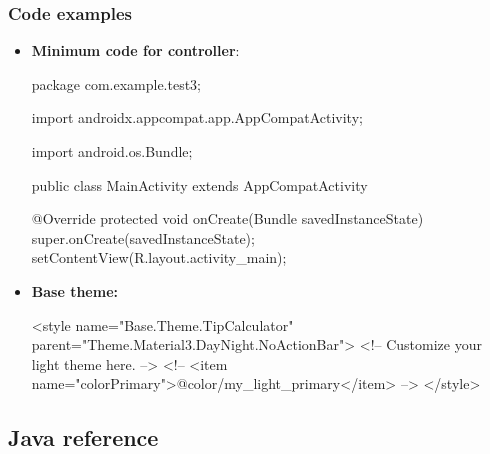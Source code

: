 \documentclass{report}
\begin{document}
\pagebreak 
    \subsubsection{Code examples}
    \begin{itemize}
        \item \textbf{Minimum code for controller}:
            \bigbreak \noindent 
            \begin{javacode}
                package com.example.test3;

                import androidx.appcompat.app.AppCompatActivity;

                import android.os.Bundle;

                public class MainActivity extends AppCompatActivity {

                    @Override
                    protected void onCreate(Bundle savedInstanceState) {
                        super.onCreate(savedInstanceState);
                        setContentView(R.layout.activity_main);
                    }
                }
            \end{javacode}
        \item \textbf{Base theme:} 
            \bigbreak \noindent 
            \begin{xmlcode}
                <style name="Base.Theme.TipCalculator" parent="Theme.Material3.DayNight.NoActionBar">
                    <!-- Customize your light theme here. -->
                    <!-- <item name="colorPrimary">@color/my_light_primary</item> -->
                </style>
            \end{xmlcode}
    \end{itemize}

    \pagebreak 
    \subsection{Java reference}
\end{document}
